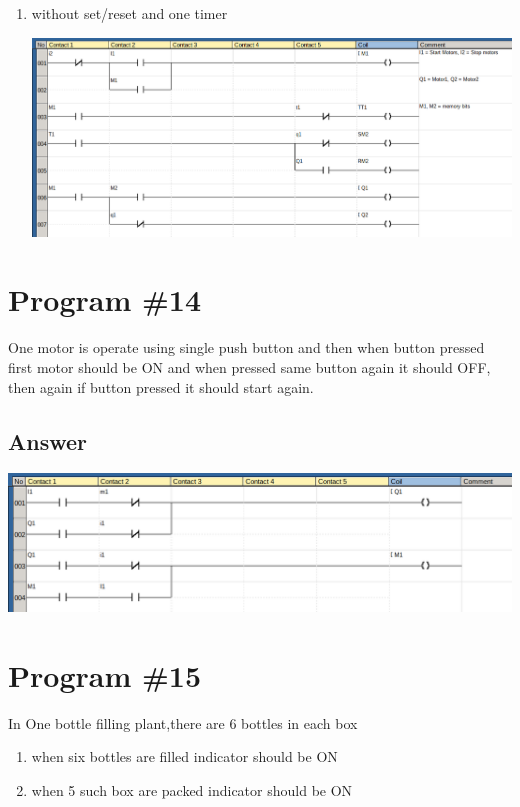\documentclass[
	12pt, %
]{fphw}
\begin{document}
\begin{enumerate}
\begin{center}
     \end{center}
   \item without set/reset and one timer
     \begin{center}
       \includegraphics[width=150mm, scale=0.80]{prg17.png}
     \end{center}
    \end{enumerate}
\section*{Program \#14}
 \begin{problem}
   One motor is operate using single push button and then when button pressed
   first motor should be ON and when pressed same button again it should OFF,
   then again if button pressed it should start again.
  \medskip
 \end{problem}
\subsection*{Answer}
  \begin{center}
   \includegraphics[width=165mm, scale=0.80]{prg18.png}
  \end{center}


 \section*{Program \#15}
  \begin{problem}
    In One bottle filling plant,there are 6 bottles in each box
    \begin{enumerate}
      \item when six bottles are filled  indicator should be ON
      \item when 5 such box are packed  indicator should be ON
    \end{enumerate}
    \medskip
  \end{problem}
  
\end{document}
